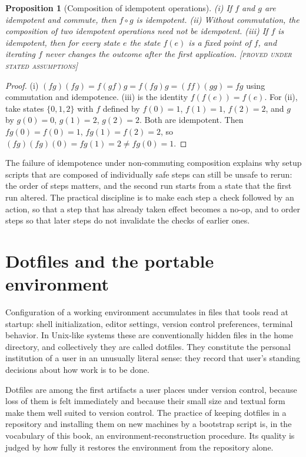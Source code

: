\documentclass[11pt,twoside,openright]{book}
\theoremstyle{plain}
\newtheorem{proposition}[theorem]{Proposition}
\theoremstyle{definition}
\theoremstyle{remark}
\newcommand{\Proved}{\textup{\textsc{[proved under stated assumptions]}}}
\begin{document}
\begin{proposition}[Composition of idempotent operations]\label{prop:idemp}
(i) If $f$ and $g$ are idempotent and commute, then $f\circ g$ is idempotent. (ii) Without commutation, the composition of two idempotent operations need not be idempotent. (iii) If $f$ is idempotent, then for every state $e$ the state $f(e)$ is a fixed point of $f$, and iterating $f$ never changes the outcome after the first application.
\Proved{}
\end{proposition}

\begin{proof}
(i) $(fg)(fg)=f(gf)g=f(fg)g=(ff)(gg)=fg$ using commutation and idempotence. (iii) is the identity $f(f(e))=f(e)$. For (ii), take states $\{0,1,2\}$ with $f$ defined by $f(0)=1$, $f(1)=1$, $f(2)=2$, and $g$ by $g(0)=0$, $g(1)=2$, $g(2)=2$. Both are idempotent. Then $fg(0)=f(0)=1$, $fg(1)=f(2)=2$, so $(fg)(fg)(0)=fg(1)=2\ne fg(0)=1$.
\end{proof}

The failure of idempotence under non-commuting composition explains why setup scripts that are composed of individually safe steps can still be unsafe to rerun: the order of steps matters, and the second run starts from a state that the first run altered. The practical discipline is to make each step a check followed by an action, so that a step that has already taken effect becomes a no-op, and to order steps so that later steps do not invalidate the checks of earlier ones.

\section{Dotfiles and the portable environment}

Configuration of a working environment accumulates in files that tools read at startup: shell initialization, editor settings, version control preferences, terminal behavior. In Unix-like systems these are conventionally hidden files in the home directory, and collectively they are called dotfiles. They constitute the personal institution of a user in an unusually literal sense: they record that user's standing decisions about how work is to be done.

Dotfiles are among the first artifacts a user places under version control, because loss of them is felt immediately and because their small size and textual form make them well suited to version control. The practice of keeping dotfiles in a repository and installing them on new machines by a bootstrap script is, in the vocabulary of this book, an environment-reconstruction procedure. Its quality is judged by how fully it restores the environment from the repository alone.
\end{document}

